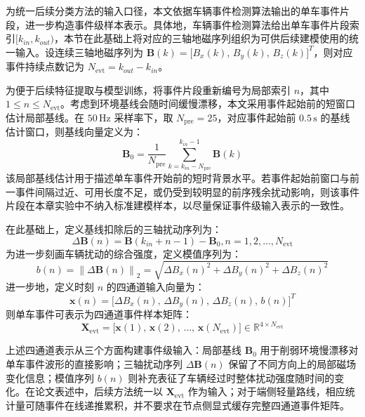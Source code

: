 \documentclass{xdupgthesis}
\begin{document}
为统一后续分类方法的输入口径，本文依据车辆事件检测算法输出的单车事件片段，进一步构造事件级样本表示。具体地，车辆事件检测算法给出单车事件片段索引$[k_{in},k_{out})$，本节在此基础上将对应的三轴地磁序列组织为可供后续建模使用的统一输入。设连续三轴地磁序列为 $\mathbf{B}(k)=\big[B_x(k),\,B_y(k),\,B_z(k)\big]^T$，则对应事件持续点数记为 $N_{\mathrm{evt}}=k_{out}-k_{in}$。

为便于后续特征提取与模型训练，将事件片段重新编号为局部索引 $n$，其中 $1\le n\le N_{\mathrm{evt}}$。考虑到环境基线会随时间缓慢漂移，本文采用事件起始前的短窗口估计局部基线。在 $50\,\mathrm{Hz}$ 采样率下，取 $N_{\mathrm{pre}}=25$，对应事件起始前 $0.5\,\mathrm{s}$ 的基线估计窗口，则基线向量定义为：
\begin{equation}
    \mathbf{B}_0=\frac{1}{N_{\mathrm{pre}}}\sum_{k=k_{in}-N_{\mathrm{pre}}}^{k_{in}-1}\mathbf{B}(k)
\end{equation}
该局部基线估计用于描述单车事件开始前的短时背景水平。若事件起始前窗口与前一事件间隔过近、可用长度不足，或仍受到较明显的前序残余扰动影响，则该事件片段在本章实验中不纳入标准建模样本，以尽量保证事件级输入表示的一致性。

在此基础上，定义基线扣除后的三轴扰动序列为：
\begin{equation}
    \Delta\mathbf{B}(n)=\mathbf{B}(k_{in}+n-1)-\mathbf{B}_0, n=1,2,\ldots,N_{\mathrm{evt}}
\end{equation}
为进一步刻画车辆扰动的综合强度，定义模值序列为：
\begin{equation}
    b(n)=\left\|\Delta\mathbf{B}(n)\right\|_2
    =\sqrt{\Delta B_x(n)^2+\Delta B_y(n)^2+\Delta B_z(n)^2}
\end{equation}
进一步地，定义时刻 $n$ 的四通道输入向量为：
\begin{equation}
    \mathbf{x}(n)=\big[\Delta B_x(n),\,\Delta B_y(n),\,\Delta B_z(n),\,b(n)\big]^T
\end{equation}
则单车事件可表示为四通道事件样本矩阵：
\begin{equation}
    \mathbf{X}_{\mathrm{evt}}=
    \big[\mathbf{x}(1),\,\mathbf{x}(2),\,\ldots,\,\mathbf{x}(N_{\mathrm{evt}})\big]
    \in \mathbb{R}^{4\times N_{\mathrm{evt}}}
\end{equation}

上述四通道表示从三个方面构建事件级输入：局部基线 $\mathbf{B}_0$ 用于削弱环境慢漂移对单车事件波形的直接影响；三轴扰动序列 $\Delta\mathbf{B}(n)$ 保留了不同方向上的局部磁场变化信息；模值序列 $b(n)$ 则补充表征了车辆经过时整体扰动强度随时间的变化。在论文表述中，后续方法统一以 $\mathbf{X}_{\mathrm{evt}}$ 作为输入；对于端侧轻量路线，相应统计量可随事件在线递推累积，并不要求在节点侧显式缓存完整四通道事件矩阵。
\end{document}
